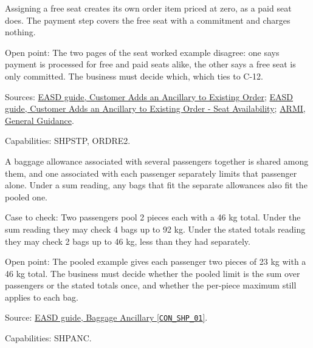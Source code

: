 \begin{theorem}
  \label{thm:ancillaries-free-seat-zero-item}
  \notready
  Assigning a free seat creates its own order item priced at zero, as a paid
  seat does. The payment step covers the free seat with a commitment and
  charges nothing.

  Open point: The two pages of the seat worked example disagree: one says
  payment is processed for free and paid seats alike, the other says a free
  seat is only committed. The business must decide which, which ties to
  C-12.

  Sources: \href{https://standards.atlassian.net/wiki/spaces/EASD/pages/842301482}{EASD guide, Customer Adds an Ancillary to Existing Order};
  \href{https://standards.atlassian.net/wiki/spaces/EASD/pages/842268814}{EASD guide, Customer Adds an Ancillary to Existing Order - Seat Availability};
  \href{https://standards.atlassian.net/wiki/spaces/ARMI/pages/584318980}{ARMI, General Guidance}.

  Capabilities: SHPSTP, ORDRE2.
\end{theorem}

\begin{definition}
  \label{def:ancillaries-pooled-baggage}
  \notready
  A baggage allowance associated with several passengers together is shared
  among them, and one associated with each passenger separately limits that
  passenger alone. Under a sum reading, any bags that fit the separate
  allowances also fit the pooled one.

  Case to check: Two passengers pool 2 pieces each with a 46 kg total. Under
  the sum reading they may check 4 bags up to 92 kg. Under the stated totals
  reading they may check 2 bags up to 46 kg, less than they had separately.

  Open point: The pooled example gives each passenger two pieces of 23 kg
  with a 46 kg total. The business must decide whether the pooled limit is
  the sum over passengers or the stated totals once, and whether the
  per-piece maximum still applies to each bag.

  Source: \href{https://standards.atlassian.net/wiki/spaces/EASD/pages/574423130}{EASD guide, Baggage Ancillary [\texttt{CON\_SHP\_01}]}.

  Capabilities: SHPANC.
\end{definition}

